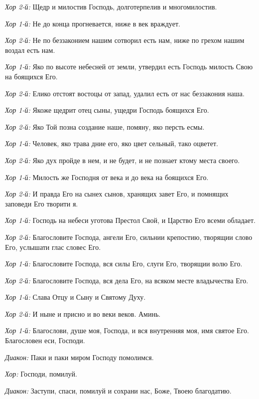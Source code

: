 \begin{mymulticols}
{\itshape Хор 2-й:} Щедр и милостив Господь, долготерпелив и многомилостив.

{\itshape Хор 1-й:} Не до конца прогневается, ниже в век враждует. 

{\itshape Хор 2-й:} Не по беззаконием нашим сотворил есть нам, ниже по грехом нашим воздал есть нам. 

{\itshape Хор 1-й:} Яко по высоте небесней от земли,  утвердил есть Господь милость Свою на боящихся Его. 

{\itshape Хор 2-й:} Елико отстоят востоцы от запад,  удалил есть от нас беззакония наша. 

{\itshape Хор 1-й:} Якоже щедрит отец сыны, ущедри Господь боящихся Его. 

{\itshape Хор 2-й:} Яко Той позна создание наше, помяну, яко персть есмы. 

{\itshape Хор 1-й:} Человек, яко трава дние его, яко цвет сельный, тако оцветет. 

{\itshape Хор 2-й:} Яко дух пройде в нем, и не будет, и не познает ктому места своего. 

{\itshape Хор 1-й:} Милость же Господня от века и до века на боящихся Его. 

{\itshape Хор 2-й:} И правда Его на сынех сынов, хранящих завет Его, и помнящих заповеди Его творити я. 

{\itshape Хор 1-й:} Господь на небеси уготова Престол Свой, и Царство Его всеми обладает. 

{\itshape Хор 2-й:} Благословите Господа, ангели Его,  сильнии крепостию, творящии слово Его, услышати глас словес Его. 

{\itshape Хор 1-й:} Благословите Господа, вся силы Его, слуги Его, творящии волю Его. 

{\itshape Хор 2-й:} Благословите Господа, вся дела Его, на всяком месте владычества Его. 

{\itshape Хор 1-й:} Слава Отцу и Сыну и Святому Духу. 

{\itshape Хор 2-й:} И ныне и присно и во веки веков. Аминь. 

{\itshape Хор 1-й:} Благослови, душе моя, Господа, и вся внутренняя моя, имя святое Его. Благословен еси, Господи.


{\itshape Диакон:} Паки и паки миром Господу помолимся. 

{\itshape Хор:} Господи, помилуй. 

{\itshape Диакон:} Заступи, спаси, помилуй и сохрани нас, Боже, Твоею благодатию. 


\end{mymulticols}
